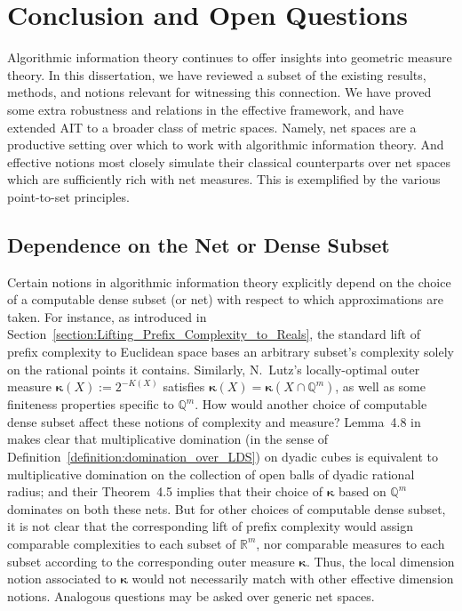 \chapter[Conclusion]{Conclusion and Open Questions}
\label{chapter:conclusion}

Algorithmic information theory continues to offer insights into geometric measure theory. In this dissertation, we have reviewed a subset of the existing results, methods, and notions relevant for witnessing this connection. We have proved some extra robustness and relations in the effective framework, and have extended AIT to a broader class of metric spaces. Namely, net spaces are a productive setting over which to work with algorithmic information theory. And effective notions most closely simulate their classical counterparts over net spaces which are sufficiently rich with net measures. This is exemplified by the various point-to-set principles. 

\section{Dependence on the Net or Dense Subset}

Certain notions in algorithmic information theory explicitly depend on the choice of a computable dense subset (or net) with respect to which approximations are taken. For instance, as introduced in Section~\ref{section:Lifting_Prefix_Complexity_to_Reals}, the standard lift of prefix complexity to Euclidean space bases an arbitrary subset's complexity solely on the rational points it contains. Similarly, N.~Lutz's locally-optimal outer measure $\boldsymbol{\kappa}(X) := 2^{-K(X)}$ satisfies $\boldsymbol{\kappa}(X) = \boldsymbol{\kappa}(X \cap \mathbb{Q}^m)$, as well as some finiteness properties specific to $\mathbb{Q}^m$. How would another choice of computable dense subset affect these notions of complexity and measure? Lemma~4.8 in \cite{LL20} makes clear that multiplicative domination (in the sense of Definition~\ref{definition:domination_over_LDS}) on dyadic cubes is equivalent to multiplicative domination on the collection of open balls of dyadic rational radius; and their Theorem~4.5 implies that their choice of $\boldsymbol{\kappa}$ based on $\mathbb{Q}^m$ dominates on both these nets. But for other choices of computable dense subset, it is not clear that the corresponding lift of prefix complexity would assign comparable complexities to each subset of $\mathbb{R}^m$, nor comparable measures to each subset according to the corresponding outer measure $\boldsymbol{\kappa}$. Thus, the local dimension notion associated to $\boldsymbol{\kappa}$ would not necessarily match with other effective dimension notions. Analogous questions may be asked over generic net spaces.  

